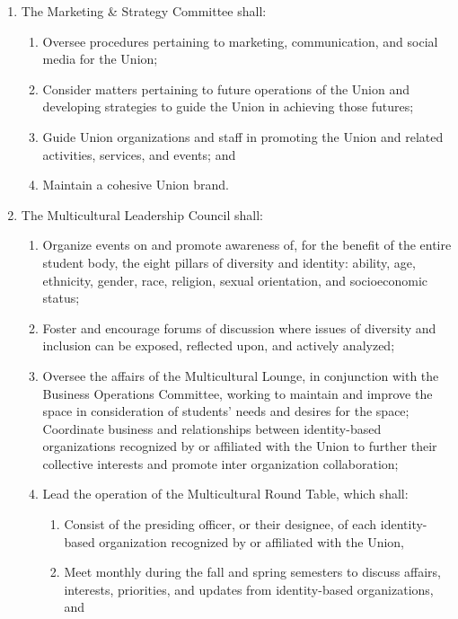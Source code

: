 \begin{enumerate}
\begin{enumerate}
  \item Oversee the pursuit of special projects initiated by the President by collaborating with the appropriate committees, groups, students, and staff and developing recommendations to the President and the Executive Board where appropriate.
  \end{enumerate}
\item The Marketing \& Strategy Committee shall:
  \begin{enumerate}
  \item Oversee procedures pertaining to marketing, communication, and social media for the Union;
  \item Consider matters pertaining to future operations of the Union and developing strategies to guide the Union in achieving those futures;
  \item Guide Union organizations and staff in promoting the Union and related activities, services, and events; and
  \item Maintain a cohesive Union brand.
  \end{enumerate}
\item The Multicultural Leadership Council shall:
  \begin{enumerate}
  \item Organize events on and promote awareness of, for the benefit of the entire student body, the eight pillars of diversity and identity: ability, age, ethnicity, gender, race, religion, sexual orientation, and socioeconomic status;
  \item Foster and encourage forums of discussion where issues of diversity and inclusion can be exposed, reflected upon, and actively analyzed;
  \item Oversee the affairs of the Multicultural Lounge, in conjunction with the Business Operations Committee, working to maintain and improve the space in consideration of students’ needs and desires for the space; Coordinate business and relationships between identity-based organizations recognized by or affiliated with the Union to further their collective interests and promote inter organization collaboration;
  \item Lead the operation of the Multicultural Round Table, which shall:
    \begin{enumerate}
    \item Consist of the presiding officer, or their designee, of each identity-based organization recognized by or affiliated with the Union,
    \item Meet monthly during the fall and spring semesters to discuss affairs, interests, priorities, and updates from identity-based organizations, and

\end{enumerate}
\end{enumerate}
\end{enumerate}
